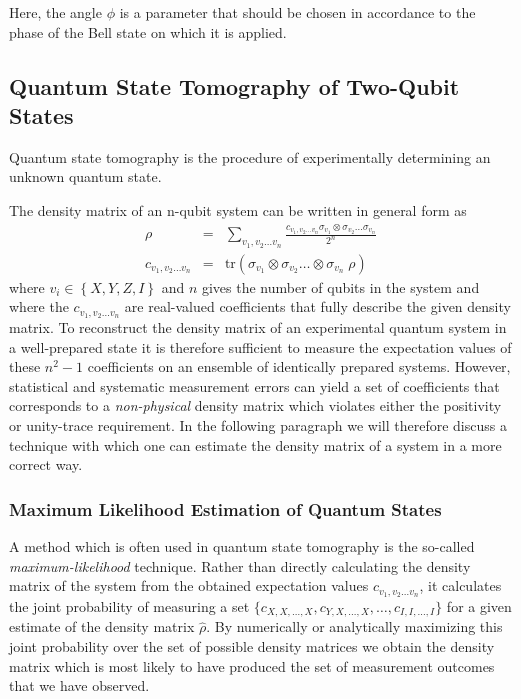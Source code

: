 Here, the angle $\phi$ is a parameter that should be chosen in accordance to the phase of the Bell state on which it is applied.

\subsection{Quantum State Tomography of Two-Qubit States}

Quantum state tomography is the procedure of experimentally determining an unknown quantum state\citep{michael_a._nielsen_quantum_2000}.

The density matrix of an n-qubit system can be written in general form as
\begin{eqnarray}
\rho & = & \sum\limits_{v_1,v_2\hdots v_n} \frac{c_{v_1,v_2\hdots v_n} \sigma_{v_1}\otimes \sigma_{v_2}\hdots \sigma_{v_n}}{2^n} \label{eq:state_tomography_state_representation} \\
c_{v_1,v_2\hdots v_n} & = & \mathrm{tr}\left(\sigma_{v_1}\otimes \sigma_{v_2}\hdots \otimes\sigma_{v_n} \; \rho \right)  \label{eq:state_tomography_coefficients}
\end{eqnarray}
where $v_i \in \left\{ X,Y,Z,I\right\}$ and $n$ gives the number of qubits in the system and where the $c_{v_1,v_2\hdots v_n}$ are real-valued coefficients that fully describe the given density matrix. To reconstruct the density matrix of an experimental quantum system in a well-prepared state it is therefore sufficient to measure the expectation values of these $n^2-1$ coefficients on an ensemble of identically prepared systems. However, statistical and systematic measurement errors can yield a set of coefficients that corresponds to a {\it non-physical} density matrix which violates either the positivity or unity-trace requirement. In the following paragraph we will therefore discuss a technique with which one can estimate the density matrix of a system in a more correct way.

\subsubsection{Maximum Likelihood Estimation of Quantum States}

A method which is often used in quantum state tomography is the so-called {\it maximum-likelihood} technique. Rather than directly calculating the density matrix of the system from the obtained expectation values $c_{v_1,v_2\hdots v_n}$, it calculates the joint probability of measuring a set $\{c_{X,X,\hdots,X},c_{Y,X,\hdots,X},\hdots,c_{I,I,\hdots,I}\}$ for a given estimate of the density matrix $\hat{\rho}$. By numerically or analytically maximizing this joint probability over the set of possible density matrices we obtain the density matrix which is most likely to have produced the set of measurement outcomes that we have observed.

